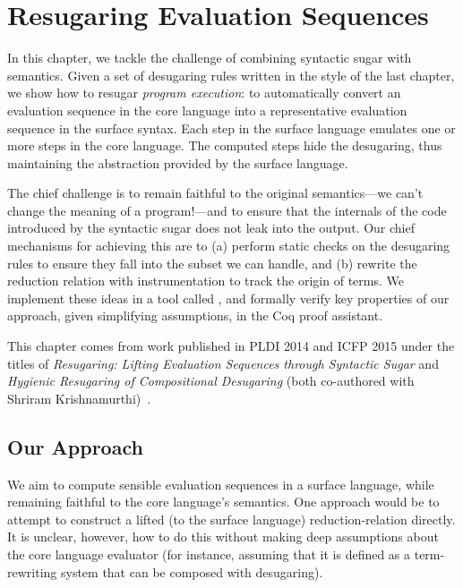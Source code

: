 \chapter{Resugaring Evaluation Sequences}\label{chap:resugar-eval}


In this chapter, we tackle the challenge of combining syntactic sugar with
semantics. Given a set of desugaring rules written in the style of the
last chapter, we show how to resugar \emph{program execution}:
to automatically convert an
evaluation sequence in the core language into a representative
evaluation sequence in the surface syntax. Each step in the surface
language emulates one or more steps
in the core language. The computed steps hide the desugaring, thus
maintaining the abstraction provided by the surface language.

The chief challenge is to
remain faithful to the original semantics---we can't change the meaning of
a program!---and to ensure that the internals of the code introduced by
the syntactic sugar does not leak into the output. Our chief mechanisms
for achieving this are to (a) perform static checks on the desugaring
rules to ensure they fall into the subset we can handle, and (b)
rewrite the reduction relation with instrumentation to track the origin of
terms. We implement these ideas in a tool called {\Resugarer}, and
formally verify key properties of our approach, given simplifying
assumptions, in the Coq proof assistant.

This chapter comes from work published in PLDI 2014 and ICFP 2015
under the titles of \emph{Resugaring: Lifting Evaluation Sequences
  through Syntactic Sugar} and \emph{Hygienic Resugaring of
  Compositional Desugaring} (both co-authored with Shriram
Krishnamurthi)~\cite{pombrio-resugar,pombrio-resugar-hygienic}.


\section{Our Approach}

We aim to compute sensible evaluation sequences in a surface language,
while remaining faithful to the core language's semantics.  One approach
would be to attempt to construct a lifted (to the surface language)
reduction-relation directly. It is unclear, however, how to do this
without making deep assumptions about the core language evaluator
(for instance, assuming that it is defined as a term-rewriting system that can be composed
with desugaring).

